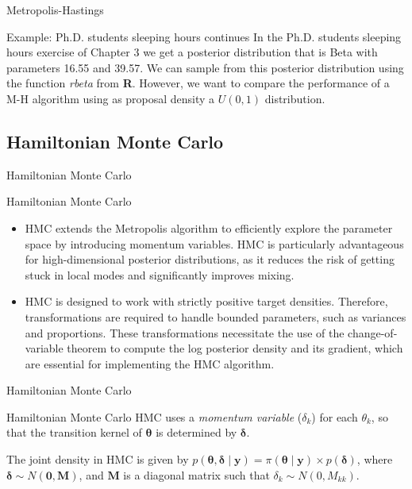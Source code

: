 \documentclass[12pt, compress]{beamer}
\begin{document}
\begin{frame}{Metropolis-Hastings}
	\begin{block}{Example: Ph.D. students sleeping hours continues}
In the Ph.D. students sleeping hours exercise of Chapter 3 we get a posterior distribution that is Beta with parameters 16.55 and 39.57. We can sample from this posterior distribution using the function \textit{rbeta} from \textbf{R}. However, we want to compare the performance of a M-H algorithm using as proposal density a $U(0,1)$ distribution.
	\end{block}
\end{frame}

\subsection{Hamiltonian Monte Carlo}
\begin{frame}{Hamiltonian Monte Carlo}
	\begin{block}{Hamiltonian Monte Carlo}
		\begin{itemize}
			\item HMC extends the Metropolis algorithm to efficiently explore the parameter space by introducing momentum variables. HMC is particularly advantageous for high-dimensional posterior distributions, as it reduces the risk of getting stuck in local modes and significantly improves mixing.
			
			\item HMC is designed to work with strictly positive target densities. Therefore, transformations are required to handle bounded parameters, such as variances and proportions. These transformations necessitate the use of the change-of-variable theorem to compute the log posterior density and its gradient, which are essential for implementing the HMC algorithm.  
		\end{itemize}
	\end{block}
\end{frame}

\begin{frame}{Hamiltonian Monte Carlo}
	\begin{block}{Hamiltonian Monte Carlo}
HMC uses a \textit{momentum variable} (\(\delta_k\)) for each \(\theta_k\), so that the transition kernel of \(\bm{\theta}\) is determined by \(\bm{\delta}\).

The joint density in HMC is given by \( p(\bm{\theta}, \bm{\delta} \mid  \bm{y}) = \pi(\bm{\theta} \mid  \bm{y}) \times p(\bm{\delta}) \), where \(\bm{\delta} \sim N(\bm{0}, \bm{M})\), and \(\bm{M}\) is a diagonal matrix such that \(\delta_k \sim N(0, M_{kk})\). 
	\end{block}
\end{frame}
\end{document}
